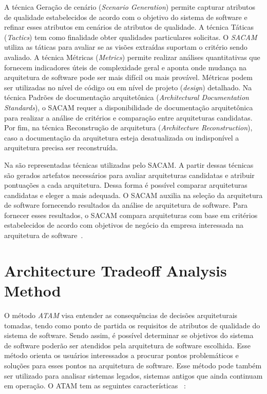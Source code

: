 A técnica Geração de cenário (\emph{Scenario Generation}) permite capturar atributos de qualidade estabelecidos de acordo com o objetivo do sistema de software  e refinar esses atributos em cenários de atributos de qualidade. A técnica Táticas (\emph{Tactics}) tem como finalidade  obter qualidades particulares solicitas.
O \emph{\acrfull{SACAM}} utiliza as táticas para avaliar se as visões extraídas suportam o critério sendo avaliado.
A técnica Métricas (\emph{Metrics}) permite realizar análises quantitativas que fornecem indicadores úteis de complexidade geral e aponta onde  mudança na arquitetura de software pode ser mais difícil ou mais provável. 
Métricas podem ser utilizadas no nível de código ou em  nível de projeto (\emph{design}) detalhado. Na técnica Padrões de documentação arquitetônica (\emph{Architectural Documentation Standards}), o SACAM requer a disponibilidade de documentação arquitetônica para realizar a análise de critérios e comparação entre arquiteturas candidatas. Por fim, na técnica Reconstrução de arquitetura (\emph{Architecture Reconstruction}), caso a documentação da arquitetura esteja desatualizada ou indisponível a arquitetura precisa ser reconstruída. 

%

Na  são representadas técnicas utilizadas pelo SACAM. A partir dessas técnicas são gerados artefatos necessários para avaliar arquiteturas candidatas e atribuir pontuações a cada arquitetura. Dessa forma é possível comparar arquiteturas candidatas e eleger a mais adequada. O SACAM auxilia na seleção da arquitetura de software fornecendo resultados da análise de arquitetura de software. Para fornecer esses resultados, o SACAM compara arquiteturas com base em critérios estabelecidos de acordo com objetivos de negócio da empresa interessada na arquitetura de software~\cite{SACAM}. 

\section{Architecture Tradeoff Analysis Method}

O método \emph{\acrfull{ATAM}} visa entender as consequências de decisões arquiteturais tomadas, tendo como ponto de partida os requisitos de atributos de qualidade do sistema de software. Sendo assim, é possível determinar se objetivos do sistema de software poderão ser atendidos pela arquitetura de software escolhida. Esse método orienta os usuários interessados a procurar pontos problemáticos e soluções para esses pontos na arquitetura de software. Esse método pode também ser utilizado para analisar sistemas legados, sistemas antigos que ainda continuam em operação. O ATAM tem as seguintes características ~\cite{ATAM}: 

